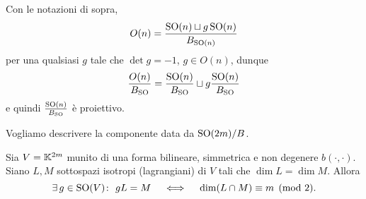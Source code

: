 \begin{remark}
Con le notazioni di sopra,
\[O(n)=\frac{\operatorname{SO}(n)\sqcup g\operatorname{SO}(n)}{B_{\operatorname{SO}(n)}}\]
per una qualsiasi $g$ tale che $\det g=-1$, $g\in O(n)$, dunque
\[\frac{O(n)}{B_{\operatorname{SO}}}=\frac{\operatorname{SO}(n)}{B_{\operatorname{SO}}}\sqcup g\frac{\operatorname{SO}(n)}{B_{\operatorname{SO}}}\]
e quindi $\frac{\operatorname{SO}(n)}{B_{\operatorname{SO}}}$ \`e proiettivo.
\end{remark}





Vogliamo descrivere la componente data da $\operatorname{SO}(2m)/B$.
\begin{theorem}
Sia $V=\mathbb{K}^{2m}$ munito di una forma bilineare, simmetrica e non degenere $b(\cdot,\cdot)$. Siano $L,M$ 
sottospazi isotropi (lagrangiani) di $V$ tali che $\dim L=\dim M$. Allora \[\exists\,g\in \SO(V)\colon \ gL=M\quad \iff \quad \dim(L\cap M)\equiv m \pmod{2}.\] 
\end{theorem}

